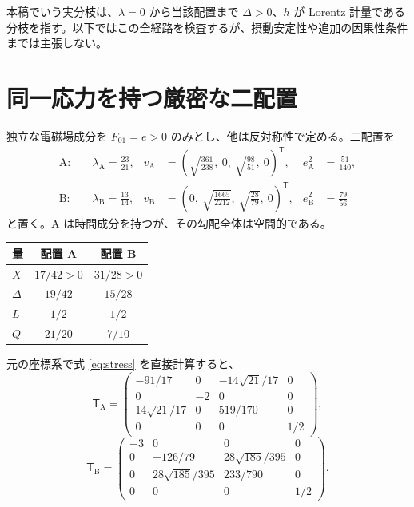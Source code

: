 \documentclass[11pt,a4paper]{article}
\newcommand{\Tmix}{\mathsf T}
\begin{document}
本稿でいう実分枝は、$\lambda=0$ から当該配置まで $\Delta>0$、$h$ が Lorentz 計量である分枝を指す。以下ではこの全経路を検査するが、摂動安定性や追加の因果性条件までは主張しない。

\newpage
\section{同一応力を持つ厳密な二配置}
独立な電磁場成分を $F_{01}=e>0$ のみとし、他は反対称性で定める。二配置を
\begin{equation}\label{eq:exact-fields}
\begin{aligned}
\mathrm A:\quad&\lambda_{\mathrm A}=\frac{23}{21},&
 v_{\mathrm A}&=\left(\sqrt{\frac{361}{238}},\ 0,\ \sqrt{\frac{98}{51}},\ 0\right)^{\!\mathsf T},&
 e_{\mathrm A}^{2}&=\frac{51}{140},\\[4pt]
\mathrm B:\quad&\lambda_{\mathrm B}=\frac{13}{14},&
 v_{\mathrm B}&=\left(0,\ \sqrt{\frac{1665}{2212}},\ \sqrt{\frac{28}{79}},\ 0\right)^{\!\mathsf T},&
 e_{\mathrm B}^{2}&=\frac{79}{56}
\end{aligned}
\end{equation}
と置く。A は時間成分を持つが、その勾配全体は空間的である。
\begin{center}
\renewcommand{\arraystretch}{1.5}
\begin{tabular}{@{}lcc@{}}\toprule
量 & 配置 A & 配置 B\\\midrule
$X$ & $17/42>0$ & $31/28>0$\\
$\Delta$ & $19/42$ & $15/28$\\
$L$ & $1/2$ & $1/2$\\
$Q$ & $21/20$ & $7/10$\\\bottomrule
\end{tabular}
\end{center}
元の座標系で式 \eqref{eq:stress} を直接計算すると、
\begin{equation}\label{eq:TrawA}
\Tmix_{\mathrm A}=\begin{pmatrix}
-91/17&0&-14\sqrt{21}/17&0\\
0&-2&0&0\\
14\sqrt{21}/17&0&519/170&0\\
0&0&0&1/2
\end{pmatrix},
\end{equation}
\begin{equation}\label{eq:TrawB}
\Tmix_{\mathrm B}=\begin{pmatrix}
-3&0&0&0\\
0&-126/79&28\sqrt{185}/395&0\\
0&28\sqrt{185}/395&233/790&0\\
0&0&0&1/2
\end{pmatrix}.
\end{equation}
\end{document}
